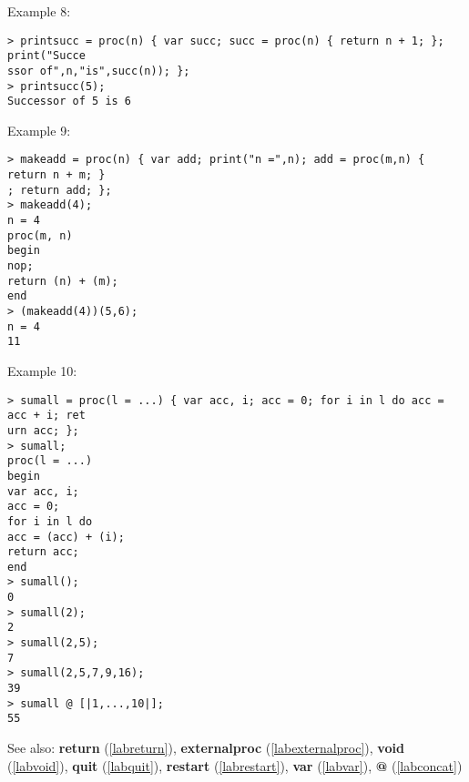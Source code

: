\noindent Example 8: 
\begin{center}\begin{minipage}{15cm}\begin{Verbatim}[frame=single]
> printsucc = proc(n) { var succ; succ = proc(n) { return n + 1; }; print("Succe
ssor of",n,"is",succ(n)); };
> printsucc(5);
Successor of 5 is 6
\end{Verbatim}
\end{minipage}\end{center}
\noindent Example 9: 
\begin{center}\begin{minipage}{15cm}\begin{Verbatim}[frame=single]
> makeadd = proc(n) { var add; print("n =",n); add = proc(m,n) { return n + m; }
; return add; };
> makeadd(4);
n = 4
proc(m, n)
begin
nop;
return (n) + (m);
end
> (makeadd(4))(5,6);
n = 4
11
\end{Verbatim}
\end{minipage}\end{center}
\noindent Example 10: 
\begin{center}\begin{minipage}{15cm}\begin{Verbatim}[frame=single]
> sumall = proc(l = ...) { var acc, i; acc = 0; for i in l do acc = acc + i; ret
urn acc; };
> sumall;
proc(l = ...)
begin
var acc, i;
acc = 0;
for i in l do
acc = (acc) + (i);
return acc;
end
> sumall();
0
> sumall(2);
2
> sumall(2,5);
7
> sumall(2,5,7,9,16);
39
> sumall @ [|1,...,10|];
55
\end{Verbatim}
\end{minipage}\end{center}
See also: \textbf{return} (\ref{labreturn}), \textbf{externalproc} (\ref{labexternalproc}), \textbf{void} (\ref{labvoid}), \textbf{quit} (\ref{labquit}), \textbf{restart} (\ref{labrestart}), \textbf{var} (\ref{labvar}), \textbf{@} (\ref{labconcat})
